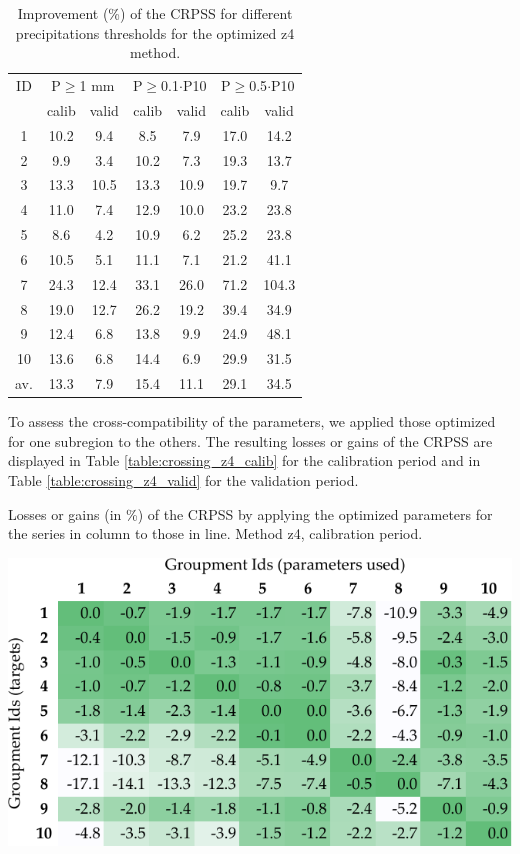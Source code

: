 \documentclass[5p]{elsarticle}
\begin{document}
\begin{table}[htbp]
	\caption{Improvement (\%) of the CRPSS for different precipitations thresholds for the optimized z4 method.}
	\footnotesize
	\begin{center}
		\begin{tabular}{ccccccc}
			\hline 
			ID & \multicolumn{2}{c}{P\(\geq\)1 mm} & \multicolumn{2}{c}{P\(\geq\)0.1\(\cdot\)P10} & \multicolumn{2}{c}{P\(\geq\)0.5\(\cdot\)P10} \\ 
			& calib & valid & calib & valid & calib & valid \\ 
			\hline 
			1 & 10.2 & 9.4 & 8.5 & 7.9 & 17.0 & 14.2 \\ 
			2 & 9.9 & 3.4 & 10.2 & 7.3 & 19.3 & 13.7 \\ 
			3 & 13.3 & 10.5 & 13.3 & 10.9 & 19.7 & 9.7 \\ 
			4 & 11.0 & 7.4 & 12.9 & 10.0 & 23.2 & 23.8 \\ 
			5 & 8.6 & 4.2 & 10.9 & 6.2 & 25.2 & 23.8 \\ 
			6 & 10.5 & 5.1 & 11.1 & 7.1 & 21.2 & 41.1 \\ 
			7 & 24.3 & 12.4 & 33.1 & 26.0 & 71.2 & 104.3 \\ 
			8 & 19.0 & 12.7 & 26.2 & 19.2 & 39.4 & 34.9 \\ 
			9 & 12.4 & 6.8 & 13.8 & 9.9 & 24.9 & 48.1 \\ 
			10 & 13.6 & 6.8 & 14.4 & 6.9 & 29.9 & 31.5 \\ 
			\hline 
			av. & 13.3 & 7.9 & 15.4 & 11.1 & 29.1 & 34.5 \\ 
			\hline 
		\end{tabular} 
	\end{center}
	\label{table:scores_thresholds_z4}
\end{table}

To assess the cross-compatibility of the parameters, we applied those optimized for one subregion to the others. The resulting losses or gains of the CRPSS are displayed in Table \ref{table:crossing_z4_calib} for the calibration period and in Table \ref{table:crossing_z4_valid} for the validation period.

\begin{table}[htb]
	\caption{Losses or gains (in \%) of the CRPSS by applying the optimized parameters for the series in column to those in line. Method z4, calibration period.}
	\centerline{\includegraphics[width=\linewidth]{figures/table_crossing_z4_calib.pdf}}
	\label{table:crossing_z4_calib}
\end{table}
\end{document}
